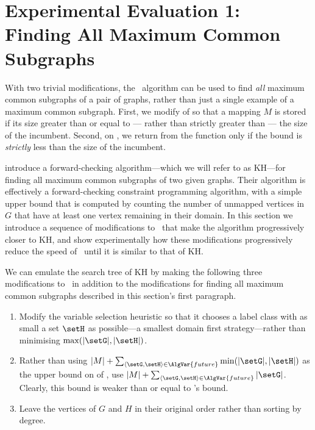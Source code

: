 \section{Experimental Evaluation 1: Finding All Maximum Common Subgraphs}
\label{sec:mcsplit-finding-all}

With two trivial modifications, the \McSplit\ algorithm can be used to find
\emph{all} maximum common subgraphs of a pair of graphs, rather than just a single
example of a maximum common subgraph.
First, we modify  of  so that
a mapping $M$ is stored if its size greater than or equal to --- rather than
strictly greater than --- the size of the incumbent.  Second, on ,
we return from the function only if the bound is \emph{strictly} less than the
size of the incumbent.

\citet{DBLP:journals/spe/KrissinelH04} introduce a forward-checking
algorithm---which we will refer to as KH---for finding all maximum common
subgraphs of two given graphs.  Their algorithm is effectively a
forward-checking constraint programming algorithm, with a simple upper bound
that is computed by counting the number of unmapped vertices in $G$ that have
at least one vertex remaining in their domain.  In this section we
introduce a sequence of modifications to \McSplit\ that make the algorithm
progressively closer to KH, and show experimentally how these modifications
progressively reduce the speed of \McSplit\ until it is similar to that of KH.

We can emulate the search tree of KH
by making the following three modifications to \McSplit\ in addition to the modifications for
finding all maximum common subgraphs described in this section's first paragraph.

\begin{enumerate}
    \item Modify the variable selection heuristic so that it chooses a label class with
as small a set $\setH$ as possible---a smallest domain first strategy---rather than minimising $\max(|\setG|,|\setH|)$.
    \item Rather 
than using $|M|  + \sum_{\langle \setG,\setH \rangle \in \AlgVar{future}} \min(|\setG|,|\setH|)$
as the upper bound on  of ,
use $|M|  + \sum_{\langle \setG,\setH \rangle \in \AlgVar{future}} |\setG|$.  Clearly,
this bound is weaker than or equal to \McSplit's bound.
    \item Leave the vertices of $G$ and $H$ in their original order rather than sorting
        by degree.
\end{enumerate}

